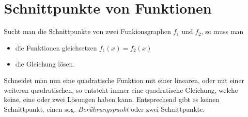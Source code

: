 \documentclass[a4paper, twoside, parskip, 10pt, smallheadings]{scrbook}
\theoremstyle{plain}
\theoremstyle{definition}
\newcommand{\bi}{\begin{itemize}}
\newcommand{\ei}{\end{itemize}}
\begin{document}
\section{Schnittpunkte von Funktionen}

Sucht man die Schnittpunkte von zwei Funkionsgraphen $f_1$ und $f_2$, so muss man 
\bi \item die Funktionen gleichsetzen $f_1(x)=f_2(x)$
    \item die Gleichung lösen.
\ei 

Schneidet man nun eine quadratische Funktion mit einer linearen, oder mit einer weiteren quadratischen, so entsteht immer eine quadratische Gleichung, welche keine, eine oder zwei Lösungen haben kann. Entsprechend gibt es keinen Schnittpunkt, einen sog. {\it Berührungspunkt} oder zwei Schnittpunkte.
\end{document}
